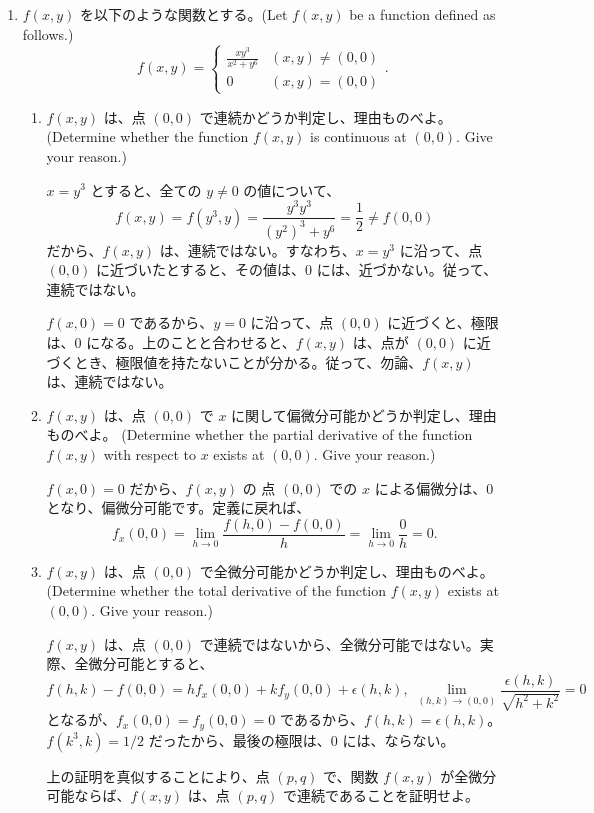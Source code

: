 \begin{enumerate}
\item $f(x,y)$ を以下のような関数とする。(Let $f(x,y)$ be a function defined as follows.)
$$f(x,y) = \left\{\begin{array}{cl} \frac{xy^3}{x^2+y^6} & (x,y)\neq (0,0)\\ 0 & (x,y) = (0,0)\end{array}\right..$$
	\begin{enumerate}
	\item $f(x,y)$ は、点 $(0,0)$ で連続かどうか判定し、理由ものべよ。
	(Determine whether the function $f(x,y)$ is continuous at $(0,0)$. Give your reason.)
	
	\sol
	$x = y^3$ とすると、全ての $y\neq 0$ の値について、
	$$f(x,y) = f(y^3,y) = \frac{y^3y^3}{(y^2)^3+y^6} = \frac12 \neq f(0,0)$$
	だから、$f(x,y)$ は、連続ではない。すなわち、$x = y^3$ に沿って、点 $(0,0)$ に近づいたとすると、その値は、$0$ には、近づかない。従って、連続ではない。
	
	\note
	$f(x,0) = 0$ であるから、$y = 0$ に沿って、点 $(0,0)$ に近づくと、極限は、$0$ になる。上のことと合わせると、$f(x,y)$ は、点が $(0,0)$ に近づくとき、極限値を持たないことが分かる。従って、勿論、$f(x,y)$ は、連続ではない。
	
	\item $f(x,y)$ は、点 $(0,0)$ で $x$ に関して偏微分可能かどうか判定し、理由ものべよ。
	(Determine whether the partial derivative of the function $f(x,y)$ with respect to $x$ exists at $(0,0)$. 
	Give your reason.)
	
	\sol
	$f(x,0) = 0$  だから、$f(x,y)$ の 点 $(0,0)$ での $x$ による偏微分は、$0$ となり、偏微分可能です。定義に戻れば、
	$$f_x(0,0) = \lim_{h\to 0}\frac{f(h,0)-f(0,0)}{h} = \lim_{h\to 0}\frac{0}{h} = 0.$$

	\item $f(x,y)$ は、点 $(0,0)$ で全微分可能かどうか判定し、理由ものべよ。
	(Determine whether the total derivative of the function $f(x,y)$ exists at $(0,0)$. 
	Give your reason.)
	
	\sol
	$f(x,y)$ は、点 $(0,0)$ で連続ではないから、全微分可能ではない。実際、全微分可能とすると、
	$$f(h,k) - f(0,0) = hf_x(0,0) + kf_y(0,0) + \epsilon(h,k),\;\lim_{(h,k)\to (0,0)}\frac{\epsilon(h,k)}{\sqrt{h^2+k^2}} = 0$$
	となるが、$f_x(0,0) = f_y(0,0) = 0$  であるから、$f(h,k) = \epsilon(h,k)$。$f(k^3,k) = 1/2$ だったから、最後の極限は、$0$ には、ならない。
	
	\note 
	上の証明を真似することにより、点 $(p,q)$ で、関数 $f(x,y)$ が全微分可能ならば、$f(x,y)$ は、点 $(p,q)$ で連続であることを証明せよ。
	

\end{enumerate}
\end{enumerate}
